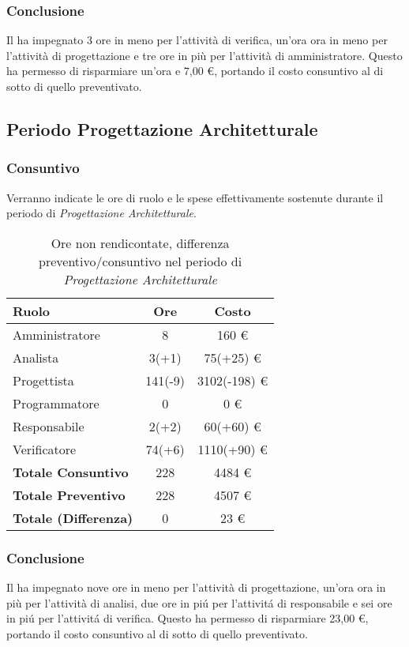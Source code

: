 \subsubsection{Conclusione}
Il  ha impegnato 3 ore in meno per l'attivit\`a di verifica, un'ora ora in meno per l'attivit\`a di progettazione e tre ore in più per l'attivit\`a di amministratore. Questo ha permesso di risparmiare un'ora e 7,00 \euro{}, portando il costo consuntivo al di sotto di quello preventivato.

\newpage


\subsection{Periodo Progettazione Architetturale}
\subsubsection{Consuntivo}
Verranno indicate le ore di ruolo e le spese effettivamente sostenute durante il periodo di \textit{Progettazione Architetturale}.

\begin{table}[H]
	\centering
	\begin{tabular}{ l c c }
		\textbf{Ruolo} & \textbf{Ore} & \textbf{Costo} \\
		\hline
		Amministratore & 8 & 160 \euro{} \\
		Analista & 3(+1) & 75(+25) \euro{} \\
		Progettista & 141(-9) & 3102(-198) \euro{} \\
		Programmatore & 0 & 0 \euro{} \\
		Responsabile & 2(+2) & 60(+60) \euro{} \\
		Verificatore & 74(+6) & 1110(+90) \euro{} \\
		\hline
		\textbf{Totale Consuntivo} & 228 & 4484 \euro{} \\
		\hline
		\textbf{Totale Preventivo} & 228 & 4507 \euro{} \\
		\hline
		\textbf{Totale (Differenza)} & 0 & 23 \euro{} \\
		\hline
	\end{tabular}
	\caption{Ore non rendicontate, differenza preventivo/consuntivo nel periodo di \textit{Progettazione Architetturale}}
\end{table}



\subsubsection{Conclusione}
Il  ha impegnato nove ore in meno per l'attivit\`a di progettazione, un'ora ora in più per l'attivit\`a di analisi, due ore in pi\'u per l'attivit\'a di responsabile e sei ore in pi\'u per l'attivit\'a di verifica. Questo ha permesso di risparmiare 23,00 \euro{}, portando il costo consuntivo al di sotto di quello preventivato.

